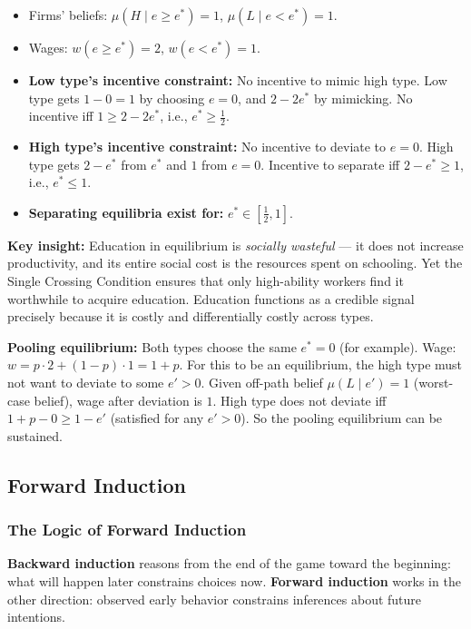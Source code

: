 \documentclass[hidelinks]{article}
\begin{document}
\begin{itemize}
    \item Firms' beliefs: $\mu(H \mid e \geq e^*) = 1$, $\mu(L \mid e < e^*) = 1$.
    \item Wages: $w(e \geq e^*) = 2$, $w(e < e^*) = 1$.
    \item \textbf{Low type's incentive constraint:} No incentive to mimic high type. Low type gets $1 - 0 = 1$ by choosing $e=0$, and $2 - 2e^*$ by mimicking. No incentive iff $1 \geq 2 - 2e^*$, i.e., $e^* \geq \frac{1}{2}$.
    \item \textbf{High type's incentive constraint:} No incentive to deviate to $e=0$. High type gets $2 - e^*$ from $e^*$ and $1$ from $e=0$. Incentive to separate iff $2 - e^* \geq 1$, i.e., $e^* \leq 1$.
    \item \textbf{Separating equilibria exist for:} $e^* \in [\frac{1}{2}, 1]$.
\end{itemize}

\textbf{Key insight:} Education in equilibrium is \textit{socially wasteful} — it does not increase productivity, and its entire social cost is the resources spent on schooling. Yet the Single Crossing Condition ensures that only high-ability workers find it worthwhile to acquire education. Education functions as a credible signal precisely because it is costly and differentially costly across types.

\textbf{Pooling equilibrium:} Both types choose the same $e^* = 0$ (for example). Wage: $w = p \cdot 2 + (1-p) \cdot 1 = 1 + p$. For this to be an equilibrium, the high type must not want to deviate to some $e' > 0$. Given off-path belief $\mu(L \mid e') = 1$ (worst-case belief), wage after deviation is $1$. High type does not deviate iff $1 + p - 0 \geq 1 - e'$ (satisfied for any $e' > 0$). So the pooling equilibrium can be sustained.

\subsection{Forward Induction}

\subsubsection{The Logic of Forward Induction}

\textbf{Backward induction} reasons from the end of the game toward the beginning: what will happen later constrains choices now. \textbf{Forward induction} works in the other direction: observed early behavior constrains inferences about future intentions.
\end{document}
